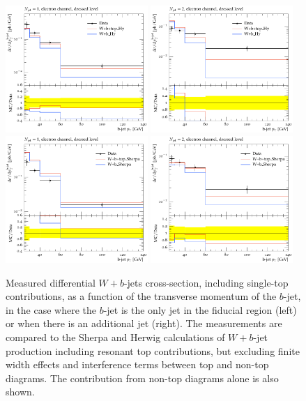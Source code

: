\documentclass[11pt]{cernrep}
\begin{document}
\begin{figure}
\centering
	\includegraphics[width=0.48\textwidth]{unsubtracted-h7-1jet.pdf}
	\includegraphics[width=0.48\textwidth]{unsubtracted-h7-2jet.pdf}
	\includegraphics[width=0.48\textwidth]{unsubtracted-s22-1jet.pdf}
	\includegraphics[width=0.48\textwidth]{unsubtracted-s22-2jet.pdf}
\caption{\label{fig:unsubtracted}
  Measured differential $W+b$-jets cross-section, including single-top contributions, as a function of the
  transverse momentum of the $b$-jet, in the case where the $b$-jet is the only jet in the fiducial region
  (left) or when there is an additional jet (right).  The measurements are compared to the Sherpa and Herwig
  calculations of $W+b$-jet production including resonant top contributions, but excluding finite width effects
  and interference terms between top and non-top diagrams. The contribution from non-top diagrams alone is
  also shown.}
\end{figure}
\end{document}
